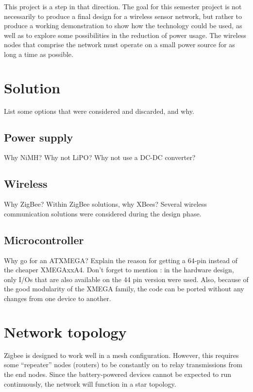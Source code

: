 This project is a step in that direction. The goal for this semester project is
not necessarily to produce a final design for a wireless sensor network, but
rather to produce a working demonstration to show how the technology could be
used, as well as to explore some possibilities in the reduction of power usage.
The wireless nodes that comprise the network must operate on a small power
source for as long a time as possible.

\section{Solution}
List some options that were considered and discarded, and why.

\subsection{Power supply}
Why NiMH? Why not LiPO? Why not use a DC-DC converter?

\subsection{Wireless}
Why ZigBee? Within ZigBee solutions, why XBees?
Several wireless communication solutions were considered during the design
phase. 

\subsection{Microcontroller}
Why go for an ATXMEGA?
Explain the reason for getting a 64-pin instead of the cheaper XMEGAxxA4.
Don't forget to mention : in the hardware design, only I/Os that are also
available on the 44 pin version were used. Also, because of the good modularity
of the XMEGA family, the code can be ported without any changes from one device
to another.

\section{Network topology}

Zigbee is designed to work well in a mesh configuration. However, this requires
some ``repeater'' nodes (routers) to be constantly on to relay transmissions
from the end nodes. Since the battery-powered devices cannot be expected to run
continuously, the network will function in a star topology.

